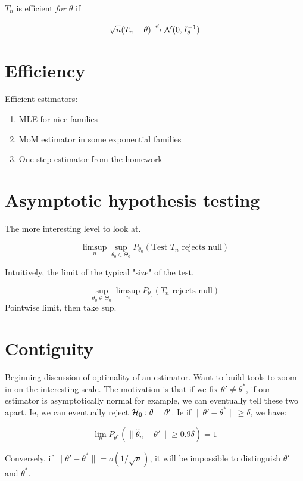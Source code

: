 \documentclass{article}
\begin{document}
\begin{definition}
$T_n$ is efficient \textit{for $\theta$} if 

$$\sqrt{n} (T_n - \theta) \xrightarrow{d} \mathcal N(0, I_\theta^{-1})$$
\end{definition}
\section{Efficiency}
Efficient estimators:
\begin{enumerate}
	\item MLE for nice families
	\item MoM estimator in some exponential families
	\item One-step estimator from the homework
\end{enumerate}


\section{Asymptotic hypothesis testing}
\begin{definition}
The more interesting level to look at. 

$$\limsup_n \sup_{\theta_0 \in \Theta_0} P_{\theta_0} (\text{Test $T_n$ rejects null})$$

Intuitively, the limit of the typical "size" of the test.
\end{definition}
\begin{definition}
$$\sup_{\theta_0 \in \Theta_0} \limsup_n P_{\theta_0}(T_n \text{ rejects null} ) $$
Pointwise limit, then take sup. 
\end{definition}


\section{Contiguity}
Beginning discussion of optimality of an estimator. Want to build tools to zoom in on the interesting scale. The motivation is that if we fix $\theta' \neq \theta^*$, if our estimator is asymptotically normal for example, we can eventually tell these two apart. Ie, we can eventually reject $\mathcal H_0: \theta = \theta'$. Ie if $\|\theta' - \theta^*\| \geq \delta$, we have:

$$\lim_n P_{\theta^*} (\| \hat \theta_n - \theta'\| \geq 0.9 \delta ) =1$$

Conversely, if $\|\theta' - \theta^*\| = o(1/\sqrt{n})$, it will be impossible to distinguish $\theta'$ and $\theta^*$. 
\begin{example}

\end{example}
\end{document}
